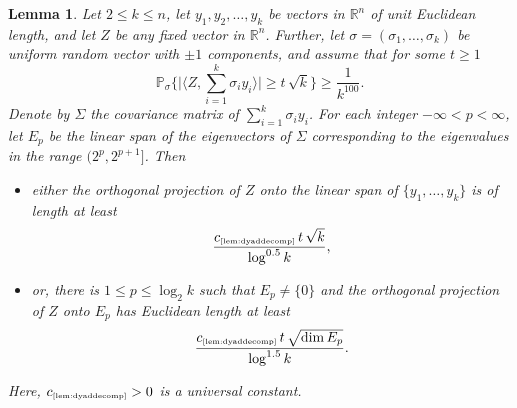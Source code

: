 \documentclass[11pt]{amsart}
\newtheorem{lemma}[theorem]{Lemma}
\newtheorem{definition}[theorem]{Definition}
\theoremstyle{definition}
\theoremstyle{plain}
\newcommand{\R}{\mathbb{R}}
\def\Prob{{\mathbb P}}
\def\R{{\mathbb R}}
\def\Prob{{\mathbb P}}
\begin{document}

\begin{lemma}\label{lem:dyaddecomp}
Let $2\leq k\leq n$, let $y_1,y_2,\dots,y_k$
be vectors in $\R^n$ of unit Euclidean length,
and let $Z$ be any fixed vector in $\R^n$.
Further, let $\sigma=(\sigma_1,\dots,\sigma_k)$
be uniform random vector with $\pm 1$ components,
and assume that for some $t\geq 1$
$$
\Prob_\sigma
\Big\{
\big|\big\langle Z,\sum_{i=1}^k \sigma_i y_i\big\rangle\big|
\geq t\,\sqrt{k}
\Big\}\geq \frac{1}{k^{100}}.
$$
Denote by $\Sigma$ the covariance matrix of $\sum_{i=1}^k \sigma_i y_i$.
For each integer $-\infty<p<\infty$,
let $E_p$ %
be the linear span of the eigenvectors of $\Sigma$
corresponding to the eigenvalues in the
range $(2^{p},2^{p+1}]$.
Then 
\begin{itemize}
\item[(a)] either the orthogonal projection of $Z$ onto the linear span of $\{y_1,\dots,y_k\}$
is of length at least $$\frac{c_{\text{\tiny\ref{lem:dyaddecomp}}}\,t\,\sqrt{k}}{\log^{0.5} k},$$
\item[(b)] or, there is $1\leq p\leq\log_2 k$
such that $E_p\neq \{0\}$ and the orthogonal projection of $Z$
onto $E_p$ has Euclidean length at least $$\frac{c_{\text{\tiny\ref{lem:dyaddecomp}}}\,t\,\sqrt{\dim E_p}}{\log^{1.5} k}.$$
\end{itemize}
Here, $c_{\text{\tiny\ref{lem:dyaddecomp}}}>0$
is a universal constant.
\end{lemma}
\end{document}
